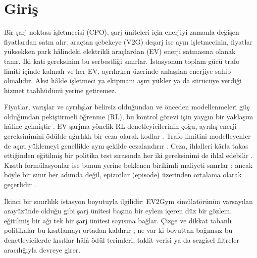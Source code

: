 \section{Giriş}\label{sec:intro}

Bir şarj noktası işletmecisi (CPO), şarj üniteleri için enerjiyi zamanla değişen fiyatlardan satın alır; araçtan şebekeye (V2G) deşarj ise aynı işletmecinin, fiyatlar yüksekken park hâlindeki elektrikli araçlardan (EV) enerji satmasına olanak tanır.
İki katı gereksinim bu serbestliği sınırlar.
İstasyonun toplam gücü trafo limiti içinde kalmalı ve her EV, ayrılırken üzerinde anlaşılan enerjiye sahip olmalıdır.
Aksi hâlde işletmeci ya ekipmanı aşırı yükler ya da sürücüye verdiği hizmet taahhüdünü yerine getiremez.

Fiyatlar, varışlar ve ayrılışlar belirsiz olduğundan ve önceden modellenmeleri güç olduğundan pekiştirmeli öğrenme (RL), bu kontrol görevi için yaygın bir yaklaşım hâline gelmiştir \cite{qiu2023reinforcement,michailidis2025reinforcement}.
EV şarjına yönelik RL denetleyicilerinin çoğu, ayrılış enerji gereksinimini ödülde ağırlıklı bir ceza olarak kodlar \cite{sadeghianpourhamami2020definition,ye2022learning,korkas2024distributed,orfanoudakis2025ev2gym}.
Trafo limitini modelleyenler de aşırı yüklemeyi genellikle aynı şekilde cezalandırır \cite{orfanoudakis2025ev2gym,orfanoudakis2026graph}.
Ceza, ihlalleri kârla takas ettiğinden eğitilmiş bir politika test sırasında her iki gereksinimi de ihlal edebilir \cite{orfanoudakis2025ev2gym,tabas2022computationally}.
Kısıtlı formülasyonlar ise bunun yerine beklenen birikimli maliyeti sınırlar \cite{altman2021constrained}; ancak böyle bir sınır her adımda değil, epizotlar (episode) üzerinden ortalama olarak geçerlidir \cite{gu2024review}.

İkinci bir sınırlılık istasyon boyutuyla ilgilidir: EV2Gym simülatörünün varsayılan arayüzünde \cite{orfanoudakis2025ev2gym} olduğu gibi şarj ünitesi başına bir eylem içeren düz bir gözlem, eğitilmiş bir ağı tek bir şarj ünitesi sayısına bağlar.
Çizge ve dikkat tabanlı politikalar bu kısıtlamayı ortadan kaldırır \cite{orfanoudakis2025scalable,orfanoudakis2026graph,wang2026hetgps}; ne var ki boyuttan bağımsız bu denetleyicilerde kısıtlar hâlâ ödül terimleri, taklit verisi ya da sezgisel filtreler aracılığıyla devreye girer.

